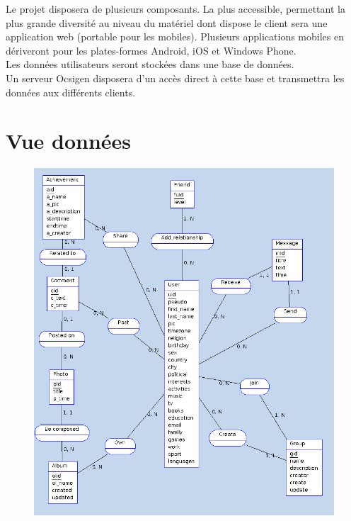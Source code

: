 \documentclass{life-fr}
\begin{document}
Le projet disposera de plusieurs composants.
La plus accessible, permettant la plus grande diversité au niveau du matériel dont dispose le client sera une application web (portable pour les mobiles).
Plusieurs applications mobiles en dériveront pour les plates-formes Android, iOS et Windows Phone.
\\
Les données utilisateurs seront stockées dans une base de données.
\\
Un serveur Ocsigen disposera d’un accès direct à cette base et transmettra les données aux différents clients.


\chapter{Vue données}

\begin{figure}[H]
  \begin{center}
    \includegraphics[width=13cm]{img/vue_donnees.png}
  \end{center}
\end{figure}
\end{document}
